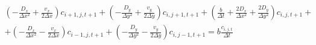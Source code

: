 \documentclass{article}
\begin{document}
\begin{multline}
  ( - \frac{D_x}{\Delta x^2} +  \frac{ v_x  }{ 2\Delta x}) c_{i+1,j,t+1} 
% 
  + ( - \frac{  D_y  }{ \Delta y^2} +   \frac{v_y  }{ 2\Delta y})   c_{i,j+1,t+1}
%   
%   
  + ( \frac{ b }{\Delta t}  + \frac{2D_x}{ \Delta x^2} + \frac{2D_y}{ \Delta y^2}) c_{i,j,t+1}
%   
  + \\
  + (-  \frac{D_x }{ \Delta x^2}   -  \frac{v_x   }{ 2\Delta x} ) c_{i-1,j,t+1}
  + (-  \frac{D_y }{ \Delta y^2}   -  \frac{v_y   }{ 2\Delta y} ) c_{i,j-1,t+1}
  =  
  b \frac{c_{i,j,t}} {\Delta t}
\end{multline}
\end{document}
